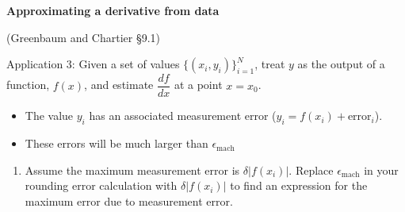 \documentclass[12pt,letterpaper,noanswers]{exam}
\begin{document}
\noindent\textbf{Approximating a derivative from data}
\begin{tcolorbox}
(Greenbaum and Chartier \S 9.1)

Application 3: Given a set of values $\{(x_i,y_i)\}_{i=1}^N$, treat $y$ as the output of a function, $f(x)$, and estimate $\dfrac{df}{dx}$ at a point $x = x_0$.
\begin{itemize}
\itemsep0pt
    \item The value $y_i$ has an associated measurement error ($y_i = f(x_i) + \text{error}_i$).
    \item These errors will be much larger than $\epsilon_{\text{mach}}$
\end{itemize}
\end{tcolorbox}
\begin{enumerate}[resume=classQ]
\item Assume the maximum measurement error is $\delta \vert f(x_i)\vert$.  Replace $\epsilon_{\text{mach}}$ in your rounding error calculation with $\delta \vert f(x_i)\vert$ to find an expression for the maximum error due to measurement error.

\vspace{1in}


\end{enumerate}
\end{document}
